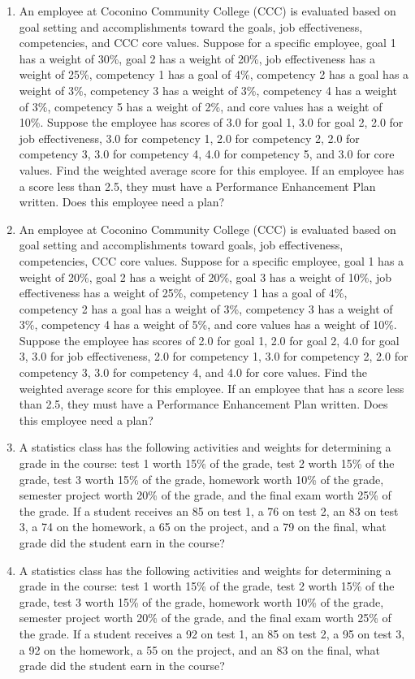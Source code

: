\documentclass[]{book}
\begin{document}
\begin{enumerate}
\def\labelenumi{\arabic{enumi}.}
\setcounter{enumi}{10}
\item
  An employee at Coconino Community College (CCC) is evaluated based
  on goal setting and accomplishments toward the goals, job
  effectiveness, competencies, and CCC core values. Suppose for a
  specific employee, goal 1 has a weight of 30\%, goal 2 has a weight
  of 20\%, job effectiveness has a weight of 25\%, competency 1 has a
  goal of 4\%, competency 2 has a goal has a weight of 3\%, competency 3
  has a weight of 3\%, competency 4 has a weight of 3\%, competency 5
  has a weight of 2\%, and core values has a weight of 10\%. Suppose the
  employee has scores of 3.0 for goal 1, 3.0 for goal 2, 2.0 for job
  effectiveness, 3.0 for competency 1, 2.0 for competency 2, 2.0 for
  competency 3, 3.0 for competency 4, 4.0 for competency 5, and 3.0
  for core values. Find the weighted average score for this employee.
  If an employee has a score less than 2.5, they must have a
  Performance Enhancement Plan written. Does this employee need a
  plan?
\item
  An employee at Coconino Community College (CCC) is evaluated based
  on goal setting and accomplishments toward goals, job effectiveness,
  competencies, CCC core values. Suppose for a specific employee, goal
  1 has a weight of 20\%, goal 2 has a weight of 20\%, goal 3 has a
  weight of 10\%, job effectiveness has a weight of 25\%, competency 1
  has a goal of 4\%, competency 2 has a goal has a weight of 3\%,
  competency 3 has a weight of 3\%, competency 4 has a weight of 5\%,
  and core values has a weight of 10\%. Suppose the employee has scores
  of 2.0 for goal 1, 2.0 for goal 2, 4.0 for goal 3, 3.0 for job
  effectiveness, 2.0 for competency 1, 3.0 for competency 2, 2.0 for
  competency 3, 3.0 for competency 4, and 4.0 for core values. Find
  the weighted average score for this employee. If an employee that
  has a score less than 2.5, they must have a Performance Enhancement
  Plan written. Does this employee need a plan?
\item
  A statistics class has the following activities and weights for
  determining a grade in the course: test 1 worth 15\% of the grade,
  test 2 worth 15\% of the grade, test 3 worth 15\% of the grade,
  homework worth 10\% of the grade, semester project worth 20\% of the
  grade, and the final exam worth 25\% of the grade. If a student
  receives an 85 on test 1, a 76 on test 2, an 83 on test 3, a 74 on
  the homework, a 65 on the project, and a 79 on the final, what grade
  did the student earn in the course?
\item
  A statistics class has the following activities and weights for
  determining a grade in the course: test 1 worth 15\% of the grade,
  test 2 worth 15\% of the grade, test 3 worth 15\% of the grade,
  homework worth 10\% of the grade, semester project worth 20\% of the
  grade, and the final exam worth 25\% of the grade. If a student
  receives a 92 on test 1, an 85 on test 2, a 95 on test 3, a 92 on
  the homework, a 55 on the project, and an 83 on the final, what
  grade did the student earn in the course?
\end{enumerate}
\end{document}
